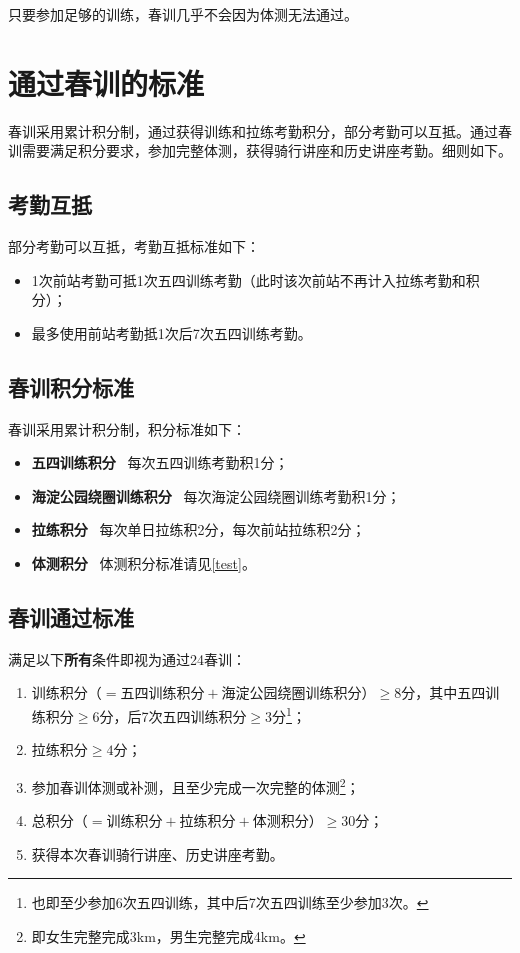 \documentclass[UTF8]{ctexart}
\begin{document}
只要参加足够的训练，春训几乎不会因为体测无法通过。 

\section{通过春训的标准}

春训采用累计积分制，通过获得训练和拉练考勤积分，部分考勤可以互抵。通过春训需要满足积分要求，参加完整体测，获得骑行讲座和历史讲座考勤。细则如下。

\subsection{考勤互抵}

部分考勤可以互抵，考勤互抵标准如下：

\begin{itemize}[nosep,left=4em]
    \item 1次前站考勤可抵1次五四训练考勤（此时该次前站不再计入拉练考勤和积分）；
    \item 最多使用前站考勤抵1次后7次五四训练考勤。 
\end{itemize}

\subsection{春训积分标准}
春训采用累计积分制，积分标准如下：

\begin{itemize}[nosep,left=4em]
    \item \textbf{五四训练积分} \ 每次五四训练考勤积1分；
    \item \textbf{海淀公园绕圈训练积分} \ 每次海淀公园绕圈训练考勤积1分；
    \item \textbf{拉练积分} \  每次单日拉练积2分，每次前站拉练积2分；
    \item \textbf{体测积分} \  体测积分标准请见\ref{test}。 
\end{itemize}

\subsection{春训通过标准}

满足以下\textbf{所有}条件即视为通过24春训：
\begin{enumerate}[nosep,left=4em]
    \item 训练积分（$=\text{五四训练积分}+\text{海淀公园绕圈训练积分}$）$\ge 8$分，其中五四训练积分$\ge 6$分，后7次五四训练积分$\ge 3$分\footnote{也即至少参加6次五四训练，其中后7次五四训练至少参加3次。}；
    \item 拉练积分$\ge 4$分；
    \item 参加春训体测或补测，且至少完成一次完整的体测\footnote{即女生完整完成3km，男生完整完成4km。}；
    \item 总积分（$=\text{训练积分}+\text{拉练积分}+\text{体测积分}$）$\ge 30$分；
    \item 获得本次春训骑行讲座、历史讲座考勤。
\end{enumerate}
\end{document}
